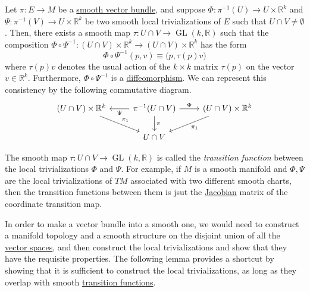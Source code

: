\documentclass{article}
\DeclareMathOperator{\GL}{GL}
\newcounter{definition}[section]
\newcounter{example}[section]
\begin{document}
  \begin{lemma}
    \label{thm:overlaps-between-trivializing-neighborhoods}
  Let $\pi: E \to M$ be a \hyperref[def:smooth-vector-bundle]{smooth vector bundle}, and suppose $\Phi: \pi^{-1} (U) \to U \times \mathbb{R}^k$ and $\Psi: \pi^{-1} (V) \to U \times \mathbb{R}^k$ be two smooth local trivializations of $E$ such that $U \cap V \neq \emptyset$. Then, there exists a smooth map $\tau: U \cap V \to \GL(k, \mathbb{R})$ such that the composition $\Phi \circ \Psi^{-1} : (U \cap V) \times \mathbb{R}^k \to (U \cap V) \times \mathbb{R}^k$ has the form
  \begin{equation}
    \Phi \circ \Psi^{-1} (p, v) \equiv \big(p, \tau(p) v \big)
  \end{equation}
  where $\tau(p) v$ denotes the usual action of the $k \times k$ matrix $\tau(p)$ on the vector $v \in \mathbb{R}^k$. Furthermore, $\Phi \circ \Psi^{-1}$ is a \hyperref[def:diffeomorphism-2]{diffeomorphism}. We can represent this consistency by the following commutative diagram. 
  \begin{equation}
    \begin{tikzcd}
      (U \cap V) \times \mathbb{R}^k \arrow{dr}{\pi_1}& \pi^{-1} (U \cap V) \arrow{l}{\Psi} \arrow{r}{\Phi} \arrow{d}{\pi} & (U \cap V) \times \mathbb{R}^k \arrow{dl}{\pi_1}\\
      & U \cap V &
      \end{tikzcd}
  \end{equation}
  \end{lemma}

  \begin{definition}
    \label{def:transition-function}
  The smooth map $\tau: U \cap V \to \GL(k, \mathbb{R})$ is called the \textit{transition function} between the local trivializations $\Phi$ and $\Psi$. For example, if $M$ is a smooth manifold and $\Phi, \Psi$ are the local trivializations of $TM$ associated with two different smooth charts, then the transition functions between them is jsut the \hyperref[mv-def:jacobian]{Jacobian} matrix of the coordinate transition map. 
  \end{definition}

  In order to make a vector bundle into a smooth one, we would need to construct a manifold topology and a smooth structure on the disjoint union of all the \hyperref[lin-def:vector-space]{vector spaces}, and then construct the local trivializations and show that they have the requisite properties. The following lemma provides a shortcut by showing that it is sufficient to construct the local trivializations, as long as they overlap with smooth \hyperref[def:transition-function]{transition functions}. 
\end{document}
